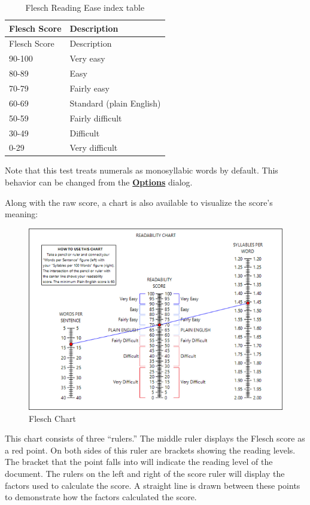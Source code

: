 \documentclass[
]{book}
\theoremstyle{definition}
\theoremstyle{definition}
\theoremstyle{definition}
\theoremstyle{definition}
\theoremstyle{remark}
\begin{document}
\begin{longtable}[]{@{}ll@{}}
\caption{Flesch Reading Ease index table}\tabularnewline
\toprule
Flesch Score & Description \\
\midrule
\endfirsthead
\toprule
Flesch Score & Description \\
\midrule
\endhead
90-100 & Very easy \\
80-89 & Easy \\
70-79 & Fairly easy \\
60-69 & Standard (plain English) \\
50-59 & Fairly difficult \\
30-49 & Difficult \\
0-29 & Very difficult \\
\bottomrule
\end{longtable}

Note that this test treats numerals as monosyllabic words by default. This behavior can be changed from the \protect\hyperlink{readability-test-options}{\textbf{Options}} dialog.

Along with the raw score, a chart is also available to visualize the score's meaning:

\begin{figure}[H]

{\centering \includegraphics[width=0.75\linewidth,]{Images/FleschChart} 

}

\caption{Flesch Chart}\label{fig:fleschChart}
\end{figure}

This chart consists of three ``rulers.'' The middle ruler displays the Flesch score as a red point. On both sides of this ruler are brackets showing the reading levels. The bracket that the point falls into will indicate the reading level of the document. The rulers on the left and right of the score ruler will display the factors used to calculate the score. A straight line is drawn between these points to demonstrate how the factors calculated the score.
\end{document}
